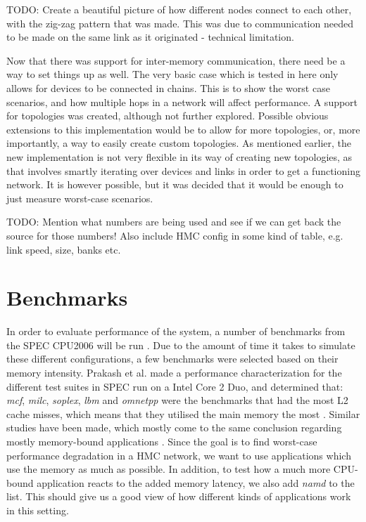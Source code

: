 TODO: Create a beautiful picture of how different nodes connect to each other, with the zig-zag pattern that was made. This was due to communication needed to be made on the same link as it originated - technical limitation.
\bigskip

Now that there was support for inter-memory communication, there need be a way to set things up as well. The very basic case which is tested in here only allows for devices to be connected in chains. This is to show the worst case scenarios, and how multiple hops in a network will affect performance. A support for topologies was created, although not further explored. Possible obvious extensions to this implementation would be to allow for more topologies, or, more importantly, a way to easily create custom topologies. As mentioned earlier, the new implementation is not very flexible in its way of creating new topologies, as that involves smartly iterating over devices and links in order to get a functioning network. It is however possible, but it was decided that it would be enough to just measure worst-case scenarios.
\bigskip

TODO: Mention what numbers are being used and see if we can get back the source for those numbers! Also include HMC config in some kind of table, e.g. link speed, size, banks etc.


\section{Benchmarks} \label{method-benches}
In order to evaluate performance of the system, a number of benchmarks from the SPEC CPU2006 will be run \cite{henning2006spec}. Due to the amount of time it takes to simulate these different configurations, a few benchmarks were selected based on their memory intensity. Prakash et al. made a performance characterization for the different test suites in SPEC run on a Intel Core 2 Duo, and determined that: \emph{mcf}, \emph{milc}, \emph{soplex}, \emph{lbm} and \emph{omnetpp} were the benchmarks that had the most L2 cache misses, which means that they utilised the main memory the most \cite{prakash2008performance}. Similar studies have been made, which mostly come to the same conclusion regarding mostly memory-bound applications \cite{4664856} \cite{4086140} \cite{bird2007performance}. Since the goal is to find worst-case performance degradation in a HMC network, we want to use applications which use the memory as much as possible. In addition, to test how a much more CPU-bound application reacts to the added memory latency, we also add \emph{namd} to the list. This should give us a good view of how different kinds of applications work in this setting. 
\bigskip

